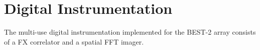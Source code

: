 \documentclass[useAMS,macros,usenatbib]{mn2e}
\begin{document}
%

\section{Digital Instrumentation}
\label{digital-inst}

The multi-use digital instrumentation implemented for the BEST-2 array consists of a FX correlator and a spatial FFT imager.
\end{document}
